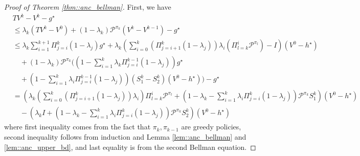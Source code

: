 \documentclass{article} %
\newcommand{\cP}{\mathcal{P}}
\newcommand*{\para}[1]{\left({#1}\right)}
\begin{document}
\begin{proof}[Proof of Theorem \ref{thm::anc_bellman}]
    First, we have 
    \begin{align*}
        &TV^k-V^k-g^{\star} 
        \\& \le \lambda_k (TV^k-V^0)+(1-\lambda_k)\cP^{\pi_k}(V^k- V^{k-1})-g^{\star}
        \\& \le \lambda_k\sum_{i=1}^{k+1} \Pi^{k}_{j=i} (1-\lambda_j)g^{\star} +\lambda_k\para{\sum_{i=0}^{k} (\Pi^k_{j=i+1} (1-\lambda_j)) \lambda_{i}\para{\Pi^{i}_{l=k}\cP^{\pi_l}}-I}(V^0-h^{\star})
        \\& \quad + (1-\lambda_k)\cP^{\pi_k}\Bigg(\para{1-\sum_{i=1}^{k} \lambda_k \Pi^{k-1}_{j=i} (1-\lambda_j)}g^{\star} 
        \\& \quad + \para{1-\sum_{i=1}^{k} \lambda_i \Pi^{k-1}_{j=i} (1-\lambda_j)}(S^{k}_1 -S^{k}_2)(V^0-h^{\star})\Bigg)-g^{\star}
        \\& = \para{\lambda_k\para{\sum_{i=0}^{k} (\Pi^k_{j=i+1} (1-\lambda_j)) \lambda_{i}}\Pi^{i}_{l=k}\cP^{\pi_l}+\para{1-\lambda_k-\sum_{i=1}^{k} \lambda_i \Pi^{k}_{j=i} (1-\lambda_j)}\cP^{\pi_k}S^{k}_1}(V^0-h^{\star})
        \\& \quad -  \para{\lambda_k I+\para{1-\lambda_k-\sum_{i=1}^{k} \lambda_i \Pi^{k}_{j=i} (1-\lambda_j)}\cP^{\pi_k}S^{k}_2}(V^0-h^{\star})
    \end{align*}
       where first inequality comes from the fact that $\pi_k, \pi_{k-1}$ are greedy policies, second inequality follows from induction and Lemma \ref{lem::anc_bellman} and \ref{lem::anc_upper_bd}, and last equality is from the second Bellman equation. 
       

\end{proof}
\end{document}

